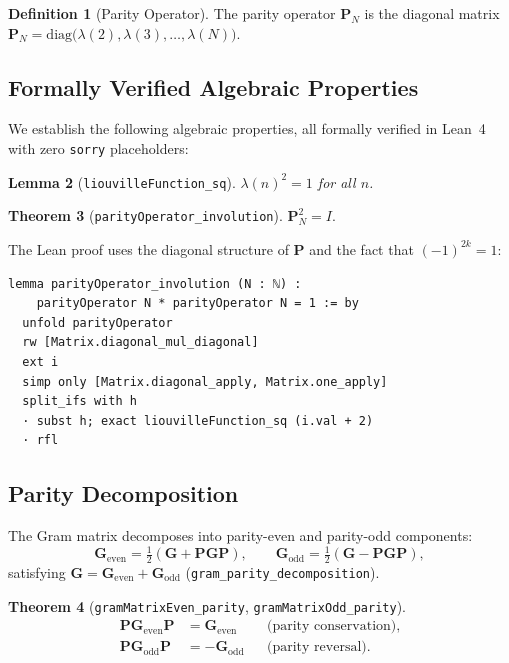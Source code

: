 \documentclass[11pt,a4paper]{article}
\newtheorem{theorem}{Theorem}[section]
\newtheorem{lemma}[theorem]{Lemma}
\theoremstyle{definition}
\newtheorem{definition}[theorem]{Definition}
\theoremstyle{remark}
\newcommand{\Gram}{\mathbf{G}}
\newcommand{\Godd}{\mathbf{G}_{\mathrm{odd}}}
\newcommand{\Geven}{\mathbf{G}_{\mathrm{even}}}
\newcommand{\Parity}{\mathbf{P}}
\newcommand{\lean}[1]{\texttt{#1}}
\begin{document}
\begin{definition}[Parity Operator]
The parity operator $\Parity_N$ is the diagonal matrix
$\Parity_N = \mathrm{diag}\bigl(\lambda(2), \lambda(3), \ldots, \lambda(N)\bigr)$.
\end{definition}

\subsection{Formally Verified Algebraic Properties}

We establish the following algebraic properties, all formally verified
in Lean~4 with zero \texttt{sorry} placeholders:

\begin{lemma}[\lean{liouvilleFunction\_sq}]
$\lambda(n)^2 = 1$ for all $n$.
\end{lemma}

\begin{theorem}[\lean{parityOperator\_involution}]\label{thm:involution}
$\Parity_N^2 = I.$
\end{theorem}

The Lean proof uses the diagonal structure of $\Parity$ and the fact that
$(-1)^{2k} = 1$:

\begin{lstlisting}
lemma parityOperator_involution (N : ℕ) :
    parityOperator N * parityOperator N = 1 := by
  unfold parityOperator
  rw [Matrix.diagonal_mul_diagonal]
  ext i
  simp only [Matrix.diagonal_apply, Matrix.one_apply]
  split_ifs with h
  · subst h; exact liouvilleFunction_sq (i.val + 2)
  · rfl
\end{lstlisting}

\subsection{Parity Decomposition}

The Gram matrix decomposes into parity-even and parity-odd components:
\[
  \Geven = \tfrac{1}{2}(\Gram + \Parity\Gram\Parity), \qquad
  \Godd  = \tfrac{1}{2}(\Gram - \Parity\Gram\Parity),
\]
satisfying $\Gram = \Geven + \Godd$ (\lean{gram\_parity\_decomposition}).

\begin{theorem}[\lean{gramMatrixEven\_parity}, \lean{gramMatrixOdd\_parity}]
\begin{align}
  \Parity \Geven \Parity &= \Geven  && \text{(parity conservation)}, \\
  \Parity \Godd  \Parity &= -\Godd  && \text{(parity reversal)}.
\end{align}
\end{theorem}
\end{document}

